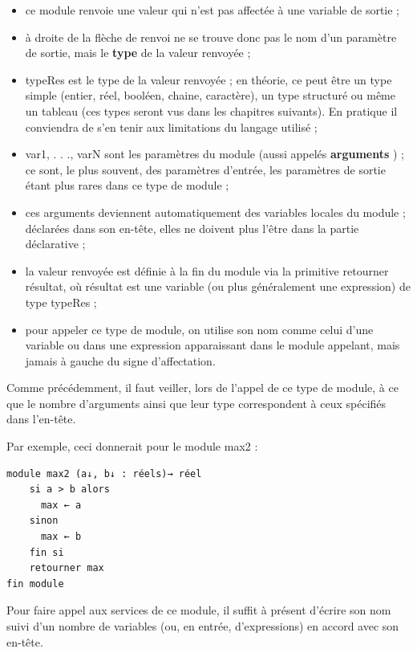 \documentclass[11pt,a4paper]{article}
\begin{document}
            \par
        
					\begin{itemize}
				
			\item ce module renvoie une valeur qui n'est pas affect\'ee \`a une variable de sortie ;
			\item \`a droite de la fl\`eche de renvoi ne se trouve donc pas le nom d'un param\`etre de sortie,
            mais le \textbf{type} de la valeur renvoy\'ee ;
			\item typeRes est le type de la valeur renvoy\'ee ; en th\'eorie, ce peut \^etre un type simple
            (entier, r\'eel, bool\'een, chaine, caract\`ere), un type structur\'e ou m\^eme un tableau (ces
            types seront vus dans les chapitres suivants). En pratique il conviendra de s'en tenir
            aux limitations du langage utilis\'e ;
			\item var1, . . ., varN sont les param\`etres du module 
            (aussi appel\'es \textbf{arguments} ) ; ce sont, le
            plus souvent, des param\`etres d'entr\'ee, les param\`etres de sortie \'etant plus rares dans
            ce type de module ;
			\item ces arguments deviennent automatiquement des variables locales du module ; d\'eclar\'ees
            dans son en-t\^ete, elles ne doivent plus l'\^etre dans la partie d\'eclarative ;
			\item la valeur renvoy\'ee est d\'efinie \`a la fin du module via la primitive retourner r\'esultat, o\`u
            r\'esultat est une variable (ou plus g\'en\'eralement une expression) de type typeRes ;
			\item pour appeler ce type de module, on utilise son nom comme celui d'une variable ou
            dans une expression apparaissant dans le module appelant, mais jamais \`a gauche du
            signe d'affectation.
					\end{itemize}
				
            \par
        
          Comme pr\'ec\'edemment, il faut veiller, lors de l'appel de ce type de module, \`a ce que le
          nombre d'arguments ainsi que leur type correspondent \`a ceux sp\'ecifi\'es dans l'en-t\^ete.
        
            \par
        Par exemple, ceci donnerait pour le module max2 : 
            \par
        \begin{verbatim}
module max2 (a↓, b↓ : réels)→ réel
    si a > b alors
      max ← a
    sinon
      max ← b
    fin si
    retourner max
fin module
      \end{verbatim}
        Pour faire appel aux services de ce module, il suffit \`a pr\'esent d'\'ecrire son nom suivi d'un
        nombre de variables (ou, en entr\'ee, d'expressions) en accord avec son en-t\^ete. 
      
\end{document}
